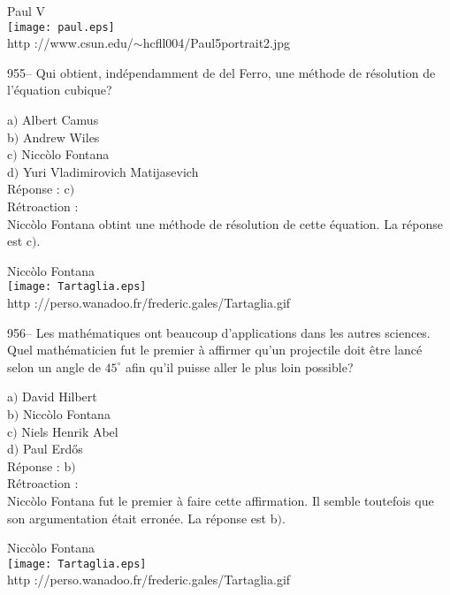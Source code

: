 ﻿\documentclass[letterpaper, 12pt]{article}
\begin{document}
        \begin{center}
        Paul V\\
    \texttt{[image: paul.eps]}\\
        {\footnotesize http
://www.csun.edu/$\sim$hcfll004/Paul5portrait2.jpg}
    \end{center}

955-- Qui obtient, ind\'ependamment de del Ferro, une m\'ethode de
r\'esolution de l'\'equation cubique?

a$)$ Albert Camus \\
b$)$ Andrew Wiles \\
c$)$ Nicc\`olo Fontana  \\
d$)$ Yuri Vladimirovich Matijasevich \\

R\'eponse : c$)$\\

R\'etroaction : \\
Nicc\`olo Fontana obtint une m\'ethode de r\'esolution de cette \'equation.
La r\'eponse est c$)$.\\

        \begin{center}
        Nicc\`olo Fontana\\
    \texttt{[image: Tartaglia.eps]}\\
        {\footnotesize http
://perso.wanadoo.fr/frederic.gales/Tartaglia.gif}
    \end{center}

956-- Les math\'ematiques ont beaucoup d'applications dans les
autres sciences. Quel math\'ematicien fut le premier \`a affirmer
qu'un projectile doit \^etre lanc\'e selon un angle de $45^{\circ}$
afin qu'il puisse aller le plus loin possible?

a$)$ David Hilbert \\
b$)$ Nicc\`olo Fontana  \\
c$)$ Niels Henrik Abel  \\
d$)$ Paul Erd\H{o}s\\

R\'eponse : b$)$\\

R\'etroaction : \\
Nicc\`olo Fontana fut le premier \`a faire cette affirmation. Il
semble toutefois que son
argumentation \'etait erron\'ee. La r\'eponse est b$)$.\\

        \begin{center}
        Nicc\`olo Fontana\\
    \texttt{[image: Tartaglia.eps]}\\
        {\footnotesize http
://perso.wanadoo.fr/frederic.gales/Tartaglia.gif}
    \end{center}
\end{document}
